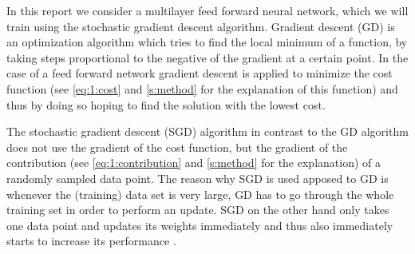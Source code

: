In this report we consider a multilayer feed forward neural network, which we will train using the stochastic gradient descent algorithm. Gradient descent (GD) is an optimization algorithm which tries to find the local minimum of a function, by taking steps proportional to the negative of the gradient at a certain point. In the case of a feed forward network gradient descent is applied to minimize the cost function (see \eqref{eq:1:cost} and \cref{s:method} for the explanation of this function) and thus by doing so hoping to find the solution with the lowest cost. 

The stochastic gradient descent (SGD) algorithm in contrast to the GD algorithm does not use the gradient of the cost function, but the gradient of the contribution (see \eqref{eq:1:contribution} and \cref{s:method} for the explanation) of a randomly sampled data point. The reason why SGD is used apposed to GD is whenever the (training) data set is very large, GD has to go through the whole training set in order to perform an update. SGD on the other hand only takes one data point and updates its weights immediately and thus also immediately starts to increase its performance \cite{bottou2010large}.
